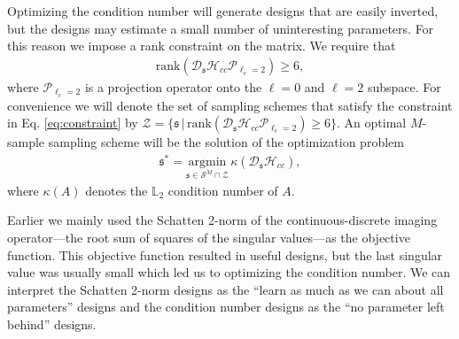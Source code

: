 \documentclass[11pt]{article}
\providecommand{\argmax}[1]{\underset{#1}{\mathrm{argmax}}\,}
\providecommand{\argmin}[1]{\underset{#1}{\mathrm{argmin}}\,}
\providecommand{\mc}[1]{\mathcal{#1}}
\providecommand{\mf}[1]{\mathfrak{#1}}
\providecommand{\mbb}[1]{\mathbb{#1}}
\begin{document}
Optimizing the condition number will generate designs that are easily inverted,
but the designs may estimate a small number of uninteresting parameters. For
this reason we impose a rank constraint on the matrix. We require that
\begin{align}
  \text{rank}(\mc{D}_{\mf{s}}\mc{H}_{cc}\mc{P}_{\ell_c = 2}) \geq 6, \label{eq:constraint}
\end{align}
where $\mc{P}_{\ell_c=2}$ is a projection operator onto the $\ell=0$ and
$\ell=2$ subspace. For convenience we will denote the set of sampling schemes
that satisfy the constraint in Eq. \eqref{eq:constraint} by
$\mc{Z} = \{\mf{s}\, |\, \text{rank}(\mc{D}_{\mf{s}}\mc{H}_{cc}\mc{P}_{\ell_c =
  2}) \geq 6\}$. An optimal $M$-sample sampling scheme will be the solution of the optimization problem 
\begin{align}
  \mf{s}^* = \argmin{\mf{s} \in \mc{S}^M \cap \mc{Z}}\kappa(\mc{D}_{\mf{s}}\mc{H}_{cc}), \label{eq:notimekappa}
\end{align}
where $\kappa(A)$ denotes the $\mbb{L}_2$ condition number of $A$.

Earlier we mainly used the Schatten 2-norm of the continuous-discrete imaging
operator---the root sum of squares of the singular values---as the objective
function. This objective function resulted in useful designs, but the last
singular value was usually small which led us to optimizing the condition
number. We can interpret the Schatten 2-norm designs as the ``learn as much as
we can about all parameters'' designs and the condition number designs as the
``no parameter left behind'' designs.


\end{document}
